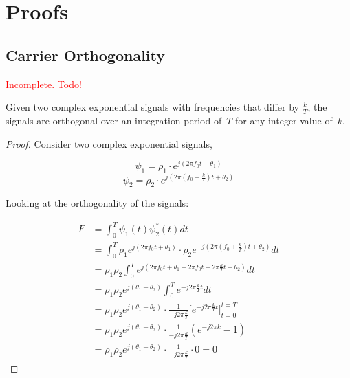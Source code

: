 \documentclass[class=report,11pt,crop=false]{standalone}
\begin{document}
\chapter{Proofs}

\section{ Carrier Orthogonality \label{sect:proofs_ofdm-orthog}}

\textcolor{red}{Incomplete. Todo!}

    Given two complex exponential signals with frequencies that differ by \(\frac{k}{T}\), the signals are orthogonal over an integration period of~\(T\) for any integer value of~\(k\).

\begin{proof}
    Consider two complex exponential signals,
    
    \begin{equation}
        \psi_1 = \rho_1 \cdot e^{j(2\pi f_0 t + \theta_1)}
    \end{equation}
    \begin{equation}
        \psi_2 = \rho_2 \cdot e^{j(2\pi (f_0 + \frac{k}{T})t + \theta_2)}
    \end{equation}

    Looking at the orthogonality of the signals:
    
        \setlength{\jot}{10pt}
        \begin{align}
            F &= \int_0^T \psi_1(t) \psi_2^*(t) dt \\
            &= \int_0^T \rho_1 e^{j(2\pi f_0 t + \theta_1)} \cdot \rho_2 e^{-j(2\pi (f_0 + \frac{k}{T})t + \theta_2)} dt \\
            &= \rho_1 \rho_2 \int_0^T e^{j(2\pi f_0 t + \theta_1 - 2\pi f_0 t - 2\pi \frac{k}{T}t - \theta_2)} dt \\
            &= \rho_1 \rho_2 e^{j(\theta_1 - \theta_2)} \int_0^T e^{-j 2\pi \frac{k}{T} t} dt \\
            &= \rho_1 \rho_2 e^{j(\theta_1 - \theta_2)} \cdot \frac{1}{-j2\pi\frac{k}{T}} \bigg[ e^{-j2\pi\frac{k}{T} t} \bigg]^{t=T}_{t=0} \\
            &= \rho_1 \rho_2 e^{j(\theta_1 - \theta_2)} \cdot \frac{1}{-j2\pi\frac{k}{T}} (e^{-j2\pi k} - 1) \\
            &= \rho_1 \rho_2 e^{j(\theta_1 - \theta_2)} \cdot \frac{1}{-j2\pi\frac{k}{T}} \cdot 0 = 0
        \end{align}
    
\end{proof}
\end{document}
